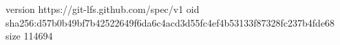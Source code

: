 version https://git-lfs.github.com/spec/v1
oid sha256:d57b0b49bf7b42522649f6da6c4acd3d55fc4ef4b53133f87328fc237b4fde68
size 114694
